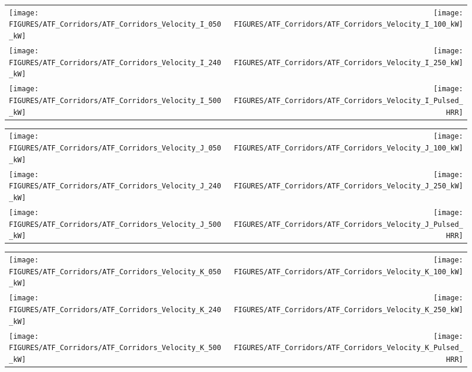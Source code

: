\begin{figure}[p]
\begin{tabular*}{\textwidth}{l@{\extracolsep{\fill}}r}
\texttt{[image: FIGURES/ATF\_Corridors/ATF\_Corridors\_Velocity\_I\_050\_kW]} &
\texttt{[image: FIGURES/ATF\_Corridors/ATF\_Corridors\_Velocity\_I\_100\_kW]} \\
\texttt{[image: FIGURES/ATF\_Corridors/ATF\_Corridors\_Velocity\_I\_240\_kW]} &
\texttt{[image: FIGURES/ATF\_Corridors/ATF\_Corridors\_Velocity\_I\_250\_kW]} \\
\texttt{[image: FIGURES/ATF\_Corridors/ATF\_Corridors\_Velocity\_I\_500\_kW]} &
\texttt{[image: FIGURES/ATF\_Corridors/ATF\_Corridors\_Velocity\_I\_Pulsed\_HRR]}
\end{tabular*}
\label{ATF_Velocity_I}
\end{figure}

\begin{figure}[p]
\begin{tabular*}{\textwidth}{l@{\extracolsep{\fill}}r}
\texttt{[image: FIGURES/ATF\_Corridors/ATF\_Corridors\_Velocity\_J\_050\_kW]} &
\texttt{[image: FIGURES/ATF\_Corridors/ATF\_Corridors\_Velocity\_J\_100\_kW]} \\
\texttt{[image: FIGURES/ATF\_Corridors/ATF\_Corridors\_Velocity\_J\_240\_kW]} &
\texttt{[image: FIGURES/ATF\_Corridors/ATF\_Corridors\_Velocity\_J\_250\_kW]} \\
\texttt{[image: FIGURES/ATF\_Corridors/ATF\_Corridors\_Velocity\_J\_500\_kW]} &
\texttt{[image: FIGURES/ATF\_Corridors/ATF\_Corridors\_Velocity\_J\_Pulsed\_HRR]}
\end{tabular*}
\label{ATF_Velocity_J}
\end{figure}

\begin{figure}[p]
\begin{tabular*}{\textwidth}{l@{\extracolsep{\fill}}r}
\texttt{[image: FIGURES/ATF\_Corridors/ATF\_Corridors\_Velocity\_K\_050\_kW]} &
\texttt{[image: FIGURES/ATF\_Corridors/ATF\_Corridors\_Velocity\_K\_100\_kW]} \\
\texttt{[image: FIGURES/ATF\_Corridors/ATF\_Corridors\_Velocity\_K\_240\_kW]} &
\texttt{[image: FIGURES/ATF\_Corridors/ATF\_Corridors\_Velocity\_K\_250\_kW]} \\
\texttt{[image: FIGURES/ATF\_Corridors/ATF\_Corridors\_Velocity\_K\_500\_kW]} &
\texttt{[image: FIGURES/ATF\_Corridors/ATF\_Corridors\_Velocity\_K\_Pulsed\_HRR]}
\end{tabular*}
\label{ATF_Velocity_K}
\end{figure}

